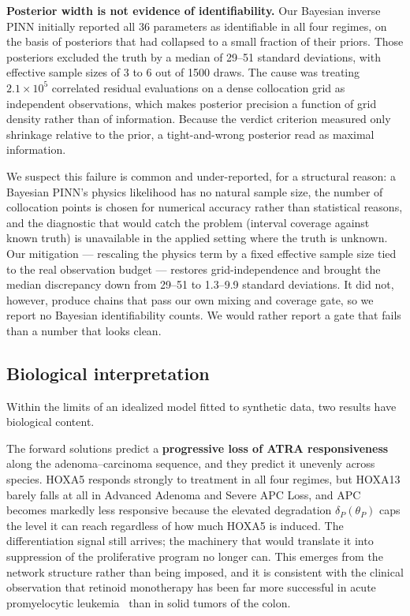 \documentclass[11pt]{article}
\newcommand{\thP}{\theta_P}
\begin{document}
\textbf{Posterior width is not evidence of identifiability.} Our Bayesian
inverse PINN initially reported all 36 parameters as identifiable in all four
regimes, on the basis of posteriors that had collapsed to a small fraction of
their priors. Those posteriors excluded the truth by a median of 29--51
standard deviations, with effective sample sizes of 3 to 6 out of 1500 draws.
The cause was treating $2.1\times10^{5}$ correlated residual evaluations on a
dense collocation grid as independent observations, which makes posterior
precision a function of grid density rather than of information. Because the
verdict criterion measured only shrinkage relative to the prior, a tight-and-wrong
posterior read as maximal information.

We suspect this failure is common and under-reported, for a structural reason:
a Bayesian PINN's physics likelihood has no natural sample size, the number of
collocation points is chosen for numerical accuracy rather than statistical
reasons, and the diagnostic that would catch the problem (interval coverage
against known truth) is unavailable in the applied setting where the truth is
unknown. Our mitigation --- rescaling the physics term by a fixed effective
sample size tied to the real observation budget --- restores grid-independence
and brought the median discrepancy down from 29--51 to 1.3--9.9 standard
deviations. It did not, however, produce chains that pass our own mixing and
coverage gate, so we report no Bayesian identifiability counts. We would rather
report a gate that fails than a number that looks clean.

\subsection{Biological interpretation}

Within the limits of an idealized model fitted to synthetic data, two results
have biological content.

The forward solutions predict a \textbf{progressive loss of ATRA
responsiveness} along the adenoma--carcinoma sequence, and they predict it
unevenly across species. HOXA5 responds strongly to treatment in all four
regimes, but HOXA13 barely falls at all in Advanced Adenoma and Severe APC
Loss, and APC becomes markedly less responsive because the elevated degradation
$\delta_P(\thP)$ caps the level it can reach regardless of how much HOXA5 is
induced. The differentiation signal still arrives; the machinery that would
translate it into suppression of the proliferative program no longer can. This
emerges from the network structure rather than being imposed, and it is
consistent with the clinical observation that retinoid monotherapy has been far
more successful in acute promyelocytic
leukemia~\citep{degos2001atra} than in solid tumors of the colon.
\end{document}
